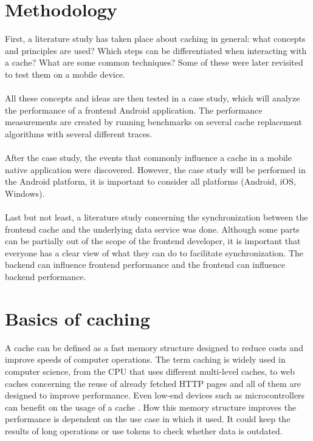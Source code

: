 \documentclass[pdftex,a4paper,12pt,twoside]{report}
\begin{document}
\chapter{Methodology}
\label{ch:methodology}
First, a literature study has taken place about caching in general: what concepts and principles are used? Which steps can be differentiated when interacting with a cache? What are some common techniques? Some of these were later revisited to test them on a mobile device.
\\\\
All these concepts and ideas are then tested in a case study, which will analyze the performance of a frontend Android application. The performance measurements are created by running benchmarks on several cache replacement algorithms with several different traces.
\\\\
After the case study, the events that commonly influence a cache in a mobile native application were discovered. However, the case study will be performed in the Android platform, it is important to consider all platforms (Android, iOS, Windows).
\\\\
Last but not least, a literature study concerning the synchronization between the frontend cache and the underlying data service was done. Although some parts can be partially out of the scope of the frontend developer, it is important that everyone has a clear view of what they can do to facilitate synchronization. The backend can influence frontend performance and the frontend can influence backend performance.
\chapter{Basics of caching}
\label{ch:caching}
A cache can be defined as a fast memory structure designed to reduce costs and improve speeds of computer operations.
The term caching is widely used in computer science, from the CPU that uses different multi-level caches, to web caches concerning
the reuse of already fetched HTTP pages \citep{rfc2616} and all of them are designed to improve performance. Even low-end devices such as microcontrollers
can benefit on the usage of a cache \citep{extremetech_multilevelcache}. How this memory structure improves the performance
is dependent on the use case in which it used. It could keep the results of long operations or use tokens to check whether data is outdated.
\end{document}
